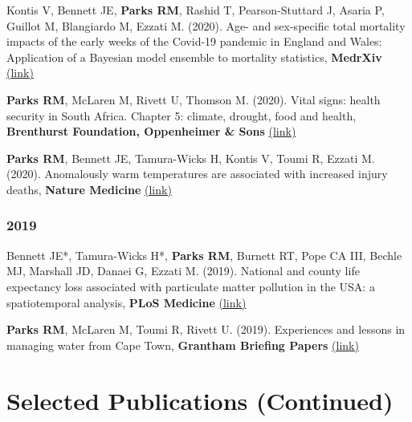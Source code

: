 \noindent Kontis V, Bennett JE, \textbf{Parks RM}, Rashid T, Pearson-Stuttard J, Asaria P, Guillot M, Blangiardo M, Ezzati M. (2020). Age- and sex-specific total mortality impacts of the early weeks of the Covid-19 pandemic in England and Wales: Application of a Bayesian model ensemble to mortality statistics, \textbf{MedrXiv} \href{https://www.medrxiv.org/content/10.1101/2020.05.20.20107680v1}{(link)} \medskip

\noindent \textbf{Parks RM}, McLaren M, Rivett U, Thomson M. (2020). Vital signs: health security in South Africa. Chapter 5: climate, drought, food and health, \textbf{Brenthurst Foundation, Oppenheimer \& Sons} \href{http://www.thebrenthurstfoundation.org/article/vital-signs-health-security-in-south-africa/}{(link)} \medskip

\noindent \textbf{Parks RM}, Bennett JE, Tamura-Wicks H, Kontis V, Toumi R, Ezzati M. (2020). Anomalously warm temperatures are associated with increased injury deaths, \textbf{Nature Medicine} \href{https://www.nature.com/articles/s41591-019-0721-y}{(link)}

\subsubsection*{2019}


\noindent Bennett JE*, Tamura-Wicks H*, \textbf{Parks RM}, Burnett RT, Pope CA III, Bechle MJ, Marshall JD, Danaei G, Ezzati M. (2019). National and county life expectancy loss associated with particulate matter pollution in the USA: a spatiotemporal analysis, \textbf{PLoS Medicine} \href{https://doi.org/10.1371/journal.pmed.1002856}{(link)} \medskip

\noindent \textbf{Parks RM}, McLaren M, Toumi R, Rivett U. (2019). Experiences and lessons in managing water from Cape Town, \textbf{Grantham Briefing Papers} \href{https://bit.ly/2Uu9oAh}{(link)}

\newpage



\section*{Selected Publications (Continued)}

